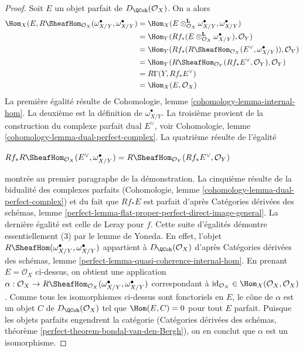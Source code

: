 \begin{proof}
\medskip\noindent
Soit $E$ un objet parfait de $D_\QCoh(\mathcal{O}_X)$. On a alors
\begin{align*}
\Hom_X(E, R\SheafHom_{\mathcal{O}_X}(\omega_{X/Y}^\bullet, \omega_{X/Y}^\bullet)
& =
\Hom_X(E \otimes_{\mathcal{O}_X}^\mathbf{L} \omega_{X/Y}^\bullet,
\omega_{X/Y}^\bullet) \\
& =
\Hom_Y(Rf_*(E \otimes_{\mathcal{O}_X}^\mathbf{L} \omega_{X/Y}^\bullet),
\mathcal{O}_Y) \\
& =
\Hom_Y(Rf_*(R\SheafHom_{\mathcal{O}_X}(E^\vee, \omega_{X/Y}^\bullet)),
\mathcal{O}_Y) \\
& =
\Hom_Y(R\SheafHom_{\mathcal{O}_Y}(Rf_*E^\vee, \mathcal{O}_Y),
\mathcal{O}_Y) \\
& =
R\Gamma(Y, Rf_*E^\vee) \\
& =
\Hom_X(E, \mathcal{O}_X)
\end{align*}
La première égalité résulte de Cohomologie, lemme \ref{cohomology-lemma-internal-hom}. La deuxième est la définition de $\omega_{X/Y}^\bullet$. La troisième provient de la construction du complexe parfait dual $E^\vee$, voir Cohomologie, lemme \ref{cohomology-lemma-dual-perfect-complex}. La quatrième résulte de l'égalité
\par\noindent\hfil
$Rf_*R\SheafHom_{\mathcal{O}_X}(E^\vee, \omega_{X/Y}^\bullet) =
R\SheafHom_{\mathcal{O}_Y}(Rf_*E^\vee, \mathcal{O}_Y)$
\hfil\par\noindent
montrée au premier paragraphe de la démonstration. La cinquième résulte de la bidualité des complexes parfaits (Cohomologie, lemme \ref{cohomology-lemma-dual-perfect-complex}) et du fait que $Rf_*E$ est parfait d'après Catégories dérivées des schémas, lemme \ref{perfect-lemma-flat-proper-perfect-direct-image-general}. La dernière égalité est celle de Leray pour $f$. Cette suite d'égalités démontre essentiellement (3) par le lemme de Yoneda. En effet, l'objet
$R\SheafHom(\omega_{X/Y}^\bullet, \omega_{X/Y}^\bullet)$
appartient à $D_\QCoh(\mathcal{O}_X)$ d'après Catégories dérivées des schémas, lemme \ref{perfect-lemma-quasi-coherence-internal-hom}. En prenant $E = \mathcal{O}_X$ ci-dessus, on obtient une application
$\alpha : \mathcal{O}_X \to
R\SheafHom_{\mathcal{O}_X}(\omega_{X/Y}^\bullet, \omega_{X/Y}^\bullet)$
correspondant à $\text{id}_{\mathcal{O}_X} \in \Hom_X(\mathcal{O}_X, \mathcal{O}_X)$. Comme tous les isomorphismes ci-dessus sont fonctoriels en $E$, le cône de $\alpha$ est un objet $C$ de $D_\QCoh(\mathcal{O}_X)$ tel que $\Hom(E, C) = 0$ pour tout $E$ parfait. Puisque les objets parfaits engendrent la catégorie (Catégories dérivées des schémas, théorème \ref{perfect-theorem-bondal-van-den-Bergh}), on en conclut que $\alpha$ est un isomorphisme.
\end{proof}

